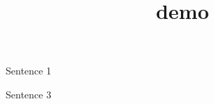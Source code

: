 \documentclass{article}
\title{demo}
\begin{document}
\maketitle

Sentence 1

Sentence 3
\end{document}
